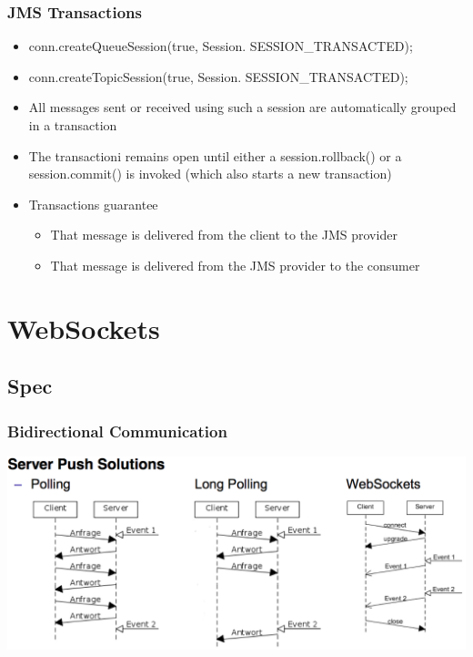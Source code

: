 \documentclass[10pt]{article}
\begin{document}
\subsubsection{JMS Transactions}
\begin{itemize}
	\item conn.createQueueSession(true, Session. SESSION\_TRANSACTED);
	\item conn.createTopicSession(true, Session. SESSION\_TRANSACTED);
	\item All messages sent or received using such a session are automatically grouped in a transaction
	\item The transactioni remains open until either a session.rollback() or a session.commit() is invoked (which also starts a new transaction)
	\item Transactions guarantee
		\begin{itemize}
			\item That message is delivered from the client to the JMS provider
			\item That message is delivered from the JMS provider to the consumer
		\end{itemize}
\end{itemize}

\newpage
\section{WebSockets}
\subsection{Spec}
\subsubsection{Bidirectional Communication}
\begin{center}
	\includegraphics[scale=0.2]{images/websockets-server-push-solutions.png}
\end{center}
\end{document}
